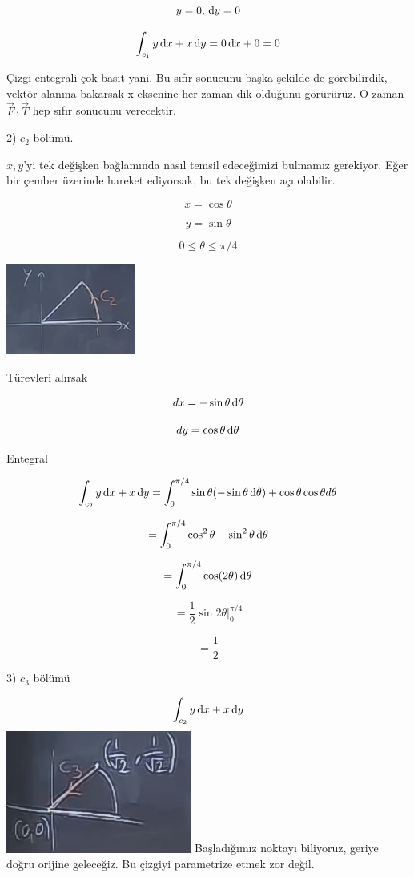 \documentclass[12pt,fleqn]{article}\usepackage{../../common}
\begin{document}
$$ y = 0, \,\mathrm{d} y = 0 $$

$$ \int_{c_1} y \,\mathrm{d} x + x \,\mathrm{d} y = 0 \,\mathrm{d} x + 0 = 0$$

Çizgi entegrali çok basit yani. Bu sıfır sonucunu başka şekilde de
görebilirdik, vektör alanına bakarsak x eksenine her zaman dik olduğunu
görürürüz. O zaman $\vec{F}\cdot \vec{T}$ hep sıfır sonucunu verecektir. 

2) $c_2$ bölümü. 

$x,y$'yi tek değişken bağlamında nasıl temsil edeceğimizi bulmamız
gerekiyor. Eğer bir çember üzerinde hareket ediyorsak, bu tek değişken açı
olabilir. 

$$ x = \cos\theta $$

$$ y = \sin\theta $$

$$ 0 \le \theta \le \pi / 4 $$

\includegraphics[height=3cm]{20_3.png}

Türevleri alırsak

$$ dx = -\sin\theta \,\mathrm{d}\theta$$

$$ dy = \cos\theta \,\mathrm{d}\theta $$

Entegral

$$
\int_{c_2} y \,\mathrm{d} x + x \,\mathrm{d} y = 
\int_0^{\pi/4} \sin\theta (-\sin\theta \,\mathrm{d}\theta)  + 
\cos\theta \cos\theta d\theta
$$

$$ = \int_0^{\pi/4} \cos^2\theta - \sin^2\theta \,\mathrm{d}\theta $$

$$ = \int_0^{\pi/4} \cos(2\theta) \,\mathrm{d}\theta $$

$$ = \frac{1}{2}\sin 2\theta \bigg|_0^{\pi/4} $$

$$ = \frac{1}{2} $$

3) $c_3$ bölümü

$$ \int_{c_2} y \,\mathrm{d} x + x \,\mathrm{d} y $$
\includegraphics[height=4cm]{20_4.png}
Başladığımız noktayı biliyoruz, geriye doğru orijine geleceğiz. Bu çizgiyi
parametrize etmek zor değil. 
\end{document}

